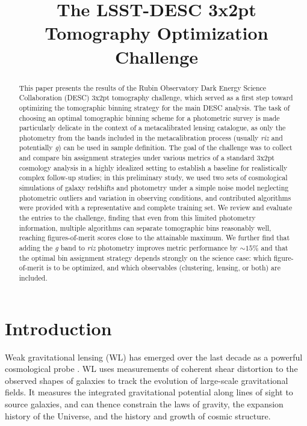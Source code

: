 \documentclass[twocolumn,twocolappendix]{aastex63}
\begin{document}
\title{The LSST-DESC 3x2pt Tomography Optimization Challenge}


\begin{abstract}
This paper presents the results of the Rubin Observatory Dark Energy Science Collaboration (DESC) 3x2pt tomography challenge, which served as a first step toward optimizing the tomographic binning strategy for the main DESC analysis. 
The task of choosing an optimal tomographic binning scheme for a photometric survey is made particularly delicate in the context of a metacalibrated lensing catalogue, as only the photometry from the bands included in the metacalibration process (usually {\em riz} and potentially {\em g}) can be used in sample definition.
The goal of the challenge was to collect and compare bin assignment strategies under various metrics of a standard 3x2pt cosmology analysis in a highly idealized setting to establish a baseline for realistically complex follow-up studies; 
in this preliminary study, we used two sets of cosmological simulations of galaxy redshifts and photometry under a simple noise model neglecting photometric outliers and variation in observing conditions, and contributed algorithms were provided with a representative and complete training set.
We review and evaluate the entries to the challenge, finding that even from this limited photometry information, multiple algorithms can separate tomographic bins reasonably well, reaching figures-of-merit scores close to the attainable maximum.
We further find that adding the \emph{g} band to \emph{riz} photometry improves metric performance by $\sim15\%$ and that the optimal bin assignment strategy depends strongly on the science case: which figure-of-merit is to be optimized, and which observables (clustering, lensing, or both) are included.
\end{abstract}




\section{Introduction}
Weak gravitational lensing (WL) has emerged over the last decade as a powerful
cosmological probe \citep{cfhtlens,rcslens,desy3a,desy3b,kids,hsc}.  WL
uses measurements of coherent shear distortion to the observed shapes of galaxies
to track the evolution of large-scale gravitational fields.  It measures the integrated
gravitational potential along lines of sight to source galaxies, and can thence constrain
the laws of gravity, the expansion history of the Universe, and the history and growth
of cosmic structure.
\end{document}
